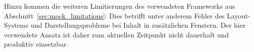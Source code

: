 Hinzu kommen die weiteren Limitierungen des verwendeten Frameworks aus Abschnitt~\ref{sec:mock_limitations}: Dies betrifft unter anderem Fehler des Layout-Systems und Darstellungsprobleme bei Inhalt in zusätzlichen Fenstern. Der hier verwendete Ansatz ist daher zum aktuellen Zeitpunkt nicht dauerhaft und produktiv einsetzbar.




